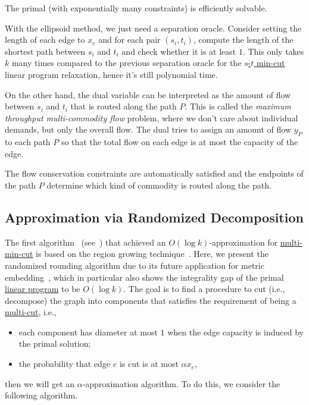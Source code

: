 \begin{remark}
	The primal (with exponentially many constraints) is efficiently solvable.
\end{remark}
\begin{explanation}
	With the ellipsoid method, we just need a separation oracle. Consider setting the length of each edge to \(x_e\) and for each pair \((s_i, t_i)\), compute the length of the shortest path between \(s_i\) and \(t_i\) and check whether it is at least \(1\). This only takes \(k\) many times compared to the previous separation oracle for the \hyperref[prb:s-t-min-cut]{\(s\)-\(t\) min-cut} linear program relaxation, hence it's still polynomial time.
\end{explanation}

On the other hand, the dual variable can be interpreted as the amount of flow between \(s_i\) and \(t_i\) that is routed along the path \(P\). This is called the \emph{maximum throughput multi-commodity flow} problem, where we don't care about individual demands, but only the overall flow. The dual tries to assign an amount of flow \(y_P\) to each path \(P\) so that the total flow on each edge is at most the capacity of the edge.

\begin{note}
	The flow conservation constraints are automatically satisfied and the endpoints of the path \(P\) determine which kind of commodity is routed along the path.
\end{note}

\subsection{Approximation via Randomized Decomposition}
The first algorithm~\cite{garg1993approximate} (see~\cite{vazirani2001approximation,williamson2011design}) that achieved an \(O(\log k)\)-approximation for \hyperref[prb:multi-min-cut]{multi-min-cut} is based on the region growing technique~\cite{leighton1999multicommodity}. Here, we present the randomized rounding algorithm due to its future application for metric embedding~\cite{calinescu2005approximation}, which in particular also shows the integrality gap of the primal \hyperref[eq:multi-min-cut-LP]{linear program} to be \(O(\log k)\). The goal is to find a procedure to cut (i.e., decompose) the graph into components that satisfies the requirement of being a \hyperref[prb:multi-min-cut]{multi-cut}, i.e.,
\begin{itemize}
	\item each component has diameter at most \(1\) when the edge capacity is induced by the primal solution;
	\item the probability that edge \(e\) is cut is at most \(\alpha x_e\),
\end{itemize}
then we will get an \(\alpha \)-approximation algorithm. To do this, we consider the following algorithm.

